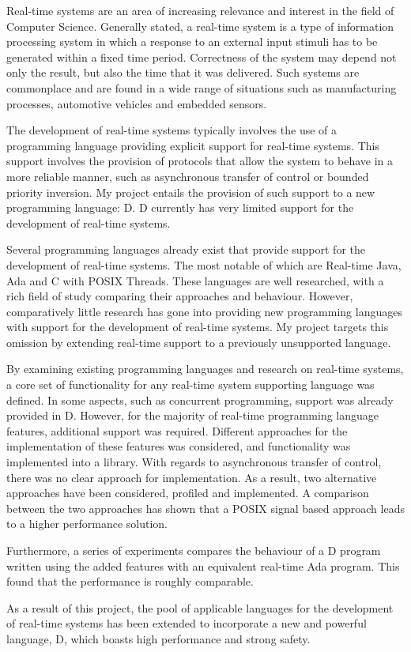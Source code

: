 
Real-time systems are an area of increasing relevance and interest in the field 
of Computer Science. Generally stated, a real-time system is a type of information 
processing system in which a response to an external input stimuli 
has to be generated within a fixed time period. Correctness of the 
system may depend not only the result, but also the time that it was delivered. 
Such systems are commonplace and are found in a wide range of 
situations such as manufacturing processes, automotive vehicles and embedded 
sensors.
\par\bigskip\noindent
The development of real-time systems typically involves the use of a programming 
language providing explicit support for real-time systems. 
This support involves the provision of protocols that allow the system to 
behave in a more reliable manner, such as asynchronous transfer of control or 
bounded priority inversion. 
My project entails the provision of such support to a new programming language: 
D. D currently has very limited support for the development of real-time systems. 
\par\bigskip\noindent
Several programming languages already exist that provide support for the 
development of real-time systems. The most notable of which are 
Real-time Java, Ada and C with POSIX Threads. These languages are well researched, 
with a rich field of study comparing their approaches and behaviour. 
However, comparatively little research has gone into providing new programming 
languages with support for the development of real-time systems. My project 
targets this omission by extending real-time support to a previously unsupported 
language.
\par\bigskip\noindent
By examining existing programming languages and research on real-time systems, a core set 
of functionality for any real-time system supporting language was defined. 
In some aspects, such as concurrent programming, support was already provided in D. 
However, for the majority of real-time programming language features,
additional support was required. Different approaches for the implementation 
of these features was considered, and functionality was implemented into 
a library. With regards to asynchronous transfer of control, there was no clear 
approach for implementation. As a result, two alternative approaches have 
been considered, profiled and implemented. A comparison between the two approaches 
has shown that a POSIX signal based approach leads to a higher performance 
solution. 
\par\bigskip\noindent
Furthermore, a series of experiments compares the behaviour of a D program written 
using the added features with an equivalent real-time Ada program. This found 
that the performance is roughly comparable. 
\par\bigskip\noindent
As a result of this project, the pool of applicable languages for the development 
of real-time systems has been extended to incorporate a new and powerful language, D, which 
boasts high performance and strong safety. 


